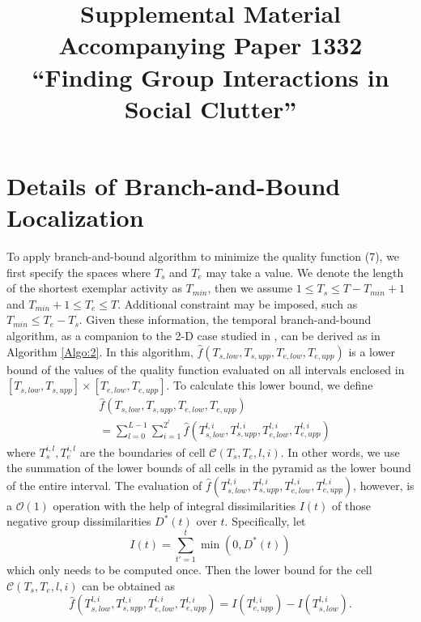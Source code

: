 \documentclass[10pt,twocolumn,letterpaper]{article}
\begin{document}
\title{Supplemental Material Accompanying Paper 1332\\ ``Finding Group Interactions in Social Clutter''}

\maketitle


\section{Details of Branch-and-Bound Localization}
\label{detailBB}

To apply branch-and-bound algorithm to minimize the quality function (7), we first specify the spaces where $T_{s}$ and $T_{e}$ may take a value. We denote the length of the shortest exemplar activity as $T_{min}$, then we assume $1\leq T_{s}\leq T-T_{min}+1$ and $T_{min}+1\leq T_{e}\leq T$. Additional constraint may be imposed, such as $T_{min}\leq T_{e}-T_{s}$. Given these information,  the temporal branch-and-bound algorithm, as a companion to the 2-D case studied in \cite{Lampert}, can be derived as in Algorithm \ref{Algo:2}.  In this algorithm, $\hat{f}(T_{s,low}, T_{s,upp}, T_{e,low}, T_{e,upp})$ is a lower bound of the values of the quality function evaluated on all intervals enclosed in $[T_{s,low}, T_{s,upp}]\times [T_{e,low}, T_{e,upp}]$. To calculate this lower bound, we define
\begin{equation}
\begin{split}
&\hat{f}(T_{s,low}, T_{s,upp}, T_{e,low}, T_{e,upp})\\
&=\sum^{L-1}_{l=0}\sum^{2^{l}}_{i=1} \hat{f}(T^{l,i}_{s,low}, T^{l,i}_{s,upp}, T^{l,i}_{e,low}, T^{l,i}_{e,upp})
\end{split}
\end{equation}
where $T^{i,l}_{s}, T^{i,l}_{e}$ are the boundaries of cell $\mathcal{C}(T_{s},T_{e}, l,i)$. In other words, we use the summation of the lower bounds of all cells in the pyramid as the lower bound of the entire interval. The evaluation of $\hat{f}(T^{l,i}_{s,low}, T^{l,i}_{s,upp}, T^{l,i}_{e,low}, T^{l,i}_{e,upp})$, however, is a $\mathcal{O}(1)$ operation with the help of integral dissimilarities $I(t)$ of those negative group dissimilarities $D^{*}(t)$ over $t$. Specifically, let
\begin{equation}
I(t)=\sum^{t}_{t'=1} \min(0,D^{*}(t))
\end{equation}
which only needs to be computed once. Then the lower bound for the cell $\mathcal{C}(T_{s},T_{e}, l,i)$ can be obtained as
\begin{equation}
\hat{f}(T^{l,i}_{s,low}, T^{l,i}_{s,upp}, T^{l,i}_{e,low}, T^{l,i}_{e,upp})=I(T^{l,i}_{e,upp})-I(T^{l,i}_{s,low}).
\end{equation}
\end{document}
